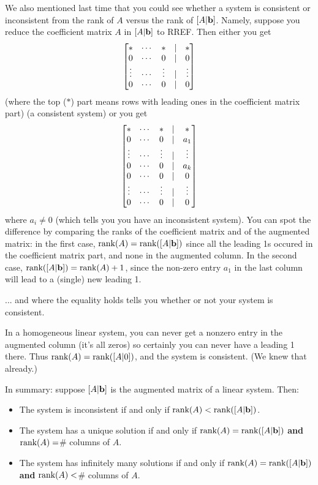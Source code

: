 We also mentioned last time that you could see whether a system is
consistent or inconsistent from the rank of $A$ versus the rank of $[A|\mathbf{b}]$.  Namely,
suppose you reduce the coefficient matrix $A$ in $[A|\mathbf{b}]$ to RREF.  Then either you get 
$$
\left[ \begin{matrix}  * & \cdots & * &|& *\\
0 & \cdots & 0 &|& 0\\
\vdots & \cdots & \vdots&|& \vdots\\
0 & \cdots & 0 &|& 0 \end{matrix} \right]
$$
(where the top ($*$)
part means rows with leading ones in the coefficient matrix part)
(a consistent system) or you get
$$
\left[ \begin{matrix}  * & \cdots & * &|& *\\
0 & \cdots & 0 &|& a_1\\
\vdots & \cdots & \vdots&|& \vdots\\
0 & \cdots & 0 &|& a_k\\
0 & \cdots & 0 &|& 0\\
\vdots & \cdots & \vdots&|& \vdots\\
0 & \cdots & 0 &|& 0 \end{matrix} \right]
$$ where $a_i\not=0$
(which tells you you have an inconsistent system).   You can spot the difference by comparing
the ranks of the coefficient matrix and of the augmented matrix:
in the first case, $\textrm{rank}(A) = \textrm{rank}([A|\mathbf{b}])$ since all the leading 1s
occured in the coefficient matrix part, and none in the augmented column.
In the second case, $\textrm{rank}([A|\mathbf{b}])=\textrm{rank}(A) +1$, since the non-zero entry $a_1$ in the last  column will lead to a (single) new
 leading 1.



... and where the equality holds tells you whether or not your system is consistent.

\begin{myexample} In a homogeneous linear system, you can never get a nonzero
entry in the augmented column (it's all zeros) so certainly you can
never have a leading 1 there.  Thus $\textrm{rank}(A) = \textrm{rank}([A|0])$, and the
system is consistent.  (We knew that already.)\end{myexample}


In summary:  suppose $[A|\mathbf{b}]$ is the augmented matrix of a linear system.
Then:
\begin{itemize}
\item The system is inconsistent if and only if $\textrm{rank}(A) < \textrm{rank}([A|\mathbf{b}])$.
\item The system has a unique solution if and only if $\textrm{rank}(A)=\textrm{rank}([A|\mathbf{b}])$
{\bf and} $\textrm{rank}(A) = $\# columns of $A$.
\item The system has infinitely many solutions   if and only if $\textrm{rank}(A)=\textrm{rank}([A|\mathbf{b}])$
{\bf and}  $\textrm{rank}(A) < $\# columns of $A$.
\end{itemize}


